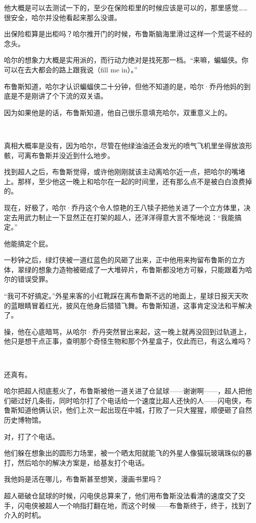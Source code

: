 \documentclass[../main]{subfiles}
\begin{document}
他大概是可以去测试一下的，至少在保险柜里的时候应该是可以的，那里感觉……很安全，哈尔并没他看起来那么没谱。

出保险柜算是出柜吗？哈尔推开门的时候，布鲁斯脑海里滑过这样一个荒诞不经的念头。

哈尔的想象力大概是实用派的，而行动力绝对是找死那一档。“来嘛，蝙蝠侠。你可以在去大都会的路上跟我说（fill
me in）。”

布鲁斯知道，哈尔才认识蝙蝠侠二十分钟，但他不知道的是，哈尔·乔丹他妈的到底是不是刚讲了个下流的双关语。

因为如果他是的话，布鲁斯知道，他自己很乐意填充哈尔，双重意义上的。

~\

真相大概率是没有，因为哈尔，尽管在他绿油油还会发光的喷气飞机里坐得放浪形骸，可离布鲁斯并没近到什么地步。

找到超人之后，布鲁斯觉得，或许他刚刚就该主动离哈尔近一点，把哈尔的嘴堵上。那样，至少他这一晚上和哈尔在一起的时间里，还有那么点不是被白白浪费掉的。

现在，好极了，哈尔·乔丹这个令人惊艳的王八犊子把他关进了一个立方体里，决定去用武力制止一下显然正在打架的超人，还洋洋得意大言不惭地说：“我能搞定。”

他能搞定个屁。

一秒钟之后，绿灯侠被一道红蓝色的风砸了出来，正中他用来拘留布鲁斯的立方体，翠绿的想象力造物被砸成了一大堆碎片，布鲁斯都没地方可躲，只能跟着为哈尔的错误受罪。

“我可不好搞定。”外星来客的小红靴踩在离布鲁斯不远的地面上，星球日报天天吹的蓝眼睛冒着红光，披风在他身后猎猎飞舞。布鲁斯知道，这事肯定没法和平解决了。

操，他在心底暗骂，从哈尔·乔丹突然冒出来起，这一晚上就再没回到过轨道上，他只是想干点正事，查明那个奇怪生物和那个外星盒子，仅此而已，有这么难吗？

~\

还真有。

哈尔把超人彻底惹火了，布鲁斯被他一道关进了仓鼠球——谢谢啊——，超人把他们砸过好几条街，同时哈尔打了个电话给一个速度比超人还快的人——闪电侠，布鲁斯知道他俩认识，他们上次一起出现在中城，打败了一只大猩猩，顺便砸了自然历史博物馆。

对，打了个电话。

他们躲在想象出的圆形力场里，被一个晒太阳就能飞的外星人像猫玩玻璃珠似的暴打，然后哈尔的解决方案是，给基友打个电话。

我他妈是活在哪儿，布鲁斯甚至想笑，漫画书里吗？

超人砸破仓鼠球的时候，闪电侠总算来了，他们用布鲁斯没法看清的速度交了交手，闪电侠被超人一个响指打翻在地，而这个时候——布鲁斯终于，终于，找到了介入的时机。
\end{document}
